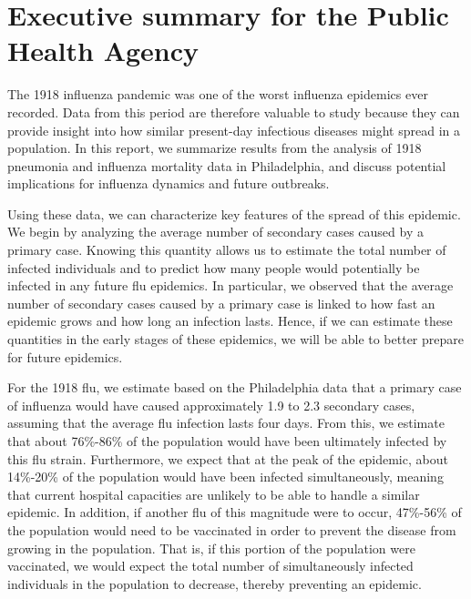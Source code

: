 \documentclass[12pt]{article}\usepackage[]{graphicx}\usepackage[]{color}
\begin{document}
\section{Executive summary for the Public Health Agency}

\ExecSumm
\newpage
The 1918 influenza pandemic was one of the worst influenza epidemics ever recorded. Data from this period are therefore valuable to study because they can provide insight into how similar present-day infectious diseases might spread in a population. In this report, we summarize results from the analysis of 1918 pneumonia and influenza mortality data in Philadelphia, and discuss potential implications for influenza dynamics and future outbreaks.

Using these data, we can characterize key features of the spread of this epidemic. We begin by analyzing the average number of secondary cases caused by a primary case. Knowing this quantity allows us to estimate the total number of infected individuals and to predict how many people would potentially be infected in any future flu epidemics. In particular, we observed that the average number of secondary cases caused by a primary case is linked to how fast an epidemic grows and how long an infection lasts. Hence, if we can estimate these quantities in the early stages of these epidemics, we will be able to better prepare for future epidemics.

For the 1918 flu, we estimate based on the Philadelphia data that a primary case of influenza would have caused approximately 1.9 to 2.3 secondary cases, assuming that the average flu infection lasts four days. From this, we estimate that about 76\%-86\% of the population would have been ultimately infected by this flu strain. Furthermore, we expect that at the peak of the epidemic, about 14\%-20\% of the population would have been infected simultaneously, meaning that current hospital capacities are unlikely to be able to handle a similar epidemic. In addition, if another flu of this magnitude were to occur, 47\%-56\% of the population would need to be vaccinated in order to prevent the disease from growing in the population. That is, if this portion of the population were vaccinated, we would expect the total number of simultaneously infected individuals in the population to decrease, thereby preventing an epidemic. 
\end{document}
